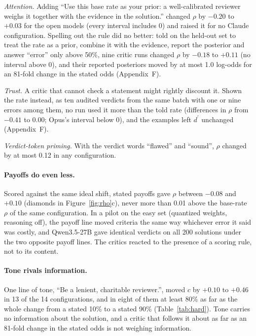 \documentclass[letterpaper]{article} %
\newcommand{\dprime}{d^{\prime}}
\begin{document}
\emph{Attention.} Adding ``Use this base rate as your prior: a well-calibrated reviewer weighs it together with the evidence in the solution.'' changed $\rho$ by $-0.20$ to $+0.03$ for the open models (every interval includes 0) and raised it for no Claude configuration. Spelling out the rule did no better: told on the held-out set to treat the rate as a prior, combine it with the evidence, report the posterior and answer ``error'' only above 50\%, nine critic runs changed $\rho$ by $-0.18$ to $+0.11$ (no interval above 0), and their reported posteriors moved by at most 1.0 log-odds for an 81-fold change in the stated odds (Appendix~F).

\emph{Trust.} A critic that cannot check a statement might rightly discount it. Shown the rate instead, as ten audited verdicts from the same batch with one or nine errors among them, no run used it more than the told rate (differences in $\rho$ from $-0.41$ to $0.00$; Opus's interval below 0), and the examples left $\dprime$ unchanged (Appendix~F).

\emph{Verdict-token priming.} With the verdict words ``flawed'' and ``sound'', $\rho$ changed by at most 0.12 in any configuration.

\paragraph{Payoffs do even less.} Scored against the same ideal shift, stated payoffs gave $\rho$ between $-0.08$ and $+0.10$ (diamonds in Figure~\ref{fig:rho}c), never more than 0.01 above the base-rate $\rho$ of the same configuration. In a pilot on the easy set (quantized weights, reasoning off), the payoff line moved criteria the same way whichever error it said was costly, and Qwen3.5-27B gave identical verdicts on all 200 solutions under the two opposite payoff lines. The critics reacted to the presence of a scoring rule, not to its content.

\paragraph{Tone rivals information.} One line of tone, ``Be a lenient, charitable reviewer.'', moved $c$ by $+0.10$ to $+0.46$ in 13 of the 14 configurations, and in eight of them at least 80\% as far as the whole change from a stated 10\% to a stated 90\% (Table~\ref{tab:hard}). Tone carries no information about the solution, and a critic that follows it about as far as an 81-fold change in the stated odds is not weighing information.
\end{document}

